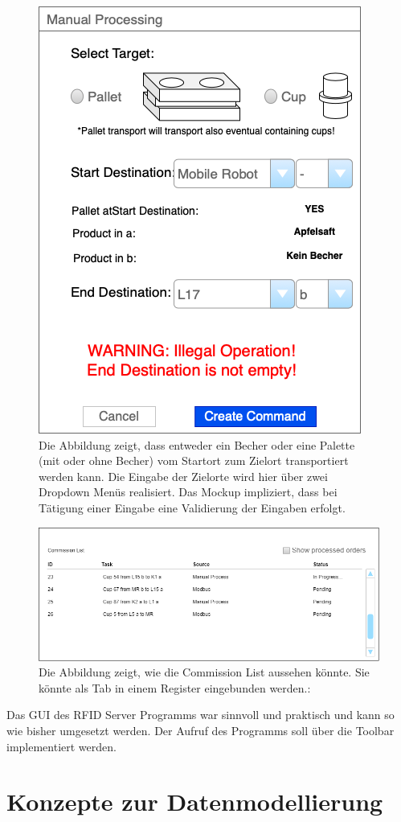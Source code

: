 \begin{figure}
        \caption[Mockup des Menüs für die manuelle Lagersteuerung]
        {\small Die Abbildung zeigt, dass entweder ein Becher oder eine Palette (mit oder ohne Becher) vom Startort zum
        Zielort transportiert werden kann. Die Eingabe der Zielorte wird hier über zwei Dropdown Menüs realisiert.
        Das Mockup impliziert, dass bei Tätigung einer Eingabe eine Validierung der Eingaben erfolgt.
        }\label{fig:figure12}
        \includegraphics[height = 0.5\textwidth ]{Bilder/Mockup_ManualProcessing}
        \centering
\end{figure}

\begin{figure}
        \caption[Mockup der Commission List]
        {\small Die Abbildung zeigt, wie die Commission List aussehen könnte. Sie könnte als Tab in einem Register eingebunden werden.:
        }\label{fig:figure13}
        \includegraphics[width = \textwidth ]{Bilder/Mockup_CommissionList}
        \centering
\end{figure}
\vspace{1cm}
Das GUI des RFID Server Programms war sinnvoll und praktisch und kann so wie bisher umgesetzt werden.
Der Aufruf des Programms soll über die Toolbar implementiert werden.

\section{Konzepte zur Datenmodellierung}

